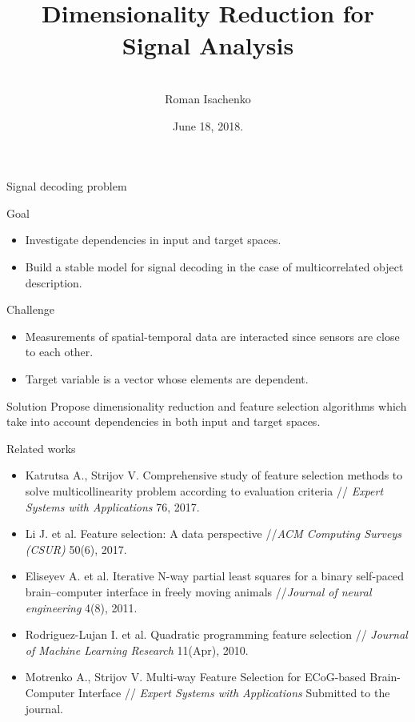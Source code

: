 \documentclass[9pt]{beamer}
\title[\hbox to 56mm{  \hfill\insertframenumber\,/\,\inserttotalframenumber}]
{\\ \vspace{1.5cm} Dimensionality Reduction for Signal Analysis}
\author[Roman Isachenko]{\\ 
	\vspace{.4cm}
	Roman Isachenko}
\institute[SkolTech]{Skoltech advisor: Maxim Fedorov \\ 
	\vspace{0.1cm}
	 MIPT advisor: Vadim Strijov
}
\date{June 18, 2018.}
\begin{document}
\begin{frame}
\titlepage
\end{frame}
\begin{frame}{Signal decoding problem}
	\begin{block}{Goal}
		\begin{itemize}
			\item Investigate dependencies in input and target spaces.
			\item Build a stable model for signal decoding in the case of multicorrelated object description.
		\end{itemize}
	\end{block}
	\begin{block}{Challenge}
		\begin{itemize}
			\item Measurements of spatial-temporal data are interacted since sensors are close to each other.
			\item Target variable is a vector whose elements are dependent.
		\end{itemize}
	\end{block}
	\begin{block}{Solution}
		Propose dimensionality reduction and feature selection algorithms which take into account dependencies in both input and target spaces. 
	\end{block}
\end{frame}
\begin{frame}{Related works}
	\begin{itemize}
		\item Katrutsa A., Strijov V. Comprehensive study of feature selection methods to solve multicollinearity problem according to evaluation criteria // \textit{Expert Systems with Applications} 76, 2017.
		\vfill
		\item Li J. et al. Feature selection: A data perspective //\textit{ACM Computing Surveys (CSUR)} 50(6), 2017.
		\vfill
		\item Eliseyev A. et al. Iterative N-way partial least squares for a binary self-paced brain–computer interface in freely moving animals //\textit{Journal of neural engineering} 4(8), 2011.
		\vfill
		\item Rodriguez-Lujan I. et al. Quadratic programming feature selection // \textit{Journal of Machine Learning Research} 11(Apr), 2010.
		\vfill
		\item Motrenko A., Strijov V. Multi-way Feature Selection for ECoG-based Brain-Computer Interface // \textit{Expert Systems with Applications} Submitted to the journal.
	\end{itemize}
\end{frame}
\end{document}
